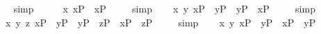 \begin{isabellebody}
\isadelimproof
\ %
\endisadelimproof
%
\isatagproof
{}\isamarkupfalse%
\ simp\ \isamarkupfalse%
%
\endisatagproof
{\isafoldproof}%
%
\isadelimproof
%
\endisadelimproof
\ \isanewline
\isanewline
\ \isamarkupfalse%
\ {\isachardoublequoteopen}{\isacharbrackleft}{\isacharparenleft}\isactrlbold {\isasymforall}x{\isachardot}\ x\isactrlsup P\ \isactrlbold {\isacharequal}\ x\isactrlsup P{\isacharparenright}{\isacharbrackright}\ {\isacharequal}\ {\isasymtop}{\isachardoublequoteclose}%
\isadelimproof
\ %
\endisadelimproof
%
\isatagproof
{}\isamarkupfalse%
\ simp\ \isamarkupfalse%
%
\endisatagproof
{\isafoldproof}%
%
\isadelimproof
%
\endisadelimproof
\isanewline
\ \isamarkupfalse%
\ {\isachardoublequoteopen}{\isacharbrackleft}{\isacharparenleft}\isactrlbold {\isasymforall}x\ y{\isachardot}\ x\isactrlsup P\ \isactrlbold {\isacharequal}\ y\isactrlsup P\ \isactrlbold {\isasymrightarrow}\ y\isactrlsup P\ \isactrlbold {\isacharequal}\ x\isactrlsup P{\isacharparenright}{\isacharbrackright}\ {\isacharequal}\ {\isasymtop}{\isachardoublequoteclose}%
\isadelimproof
\ %
\endisadelimproof
%
\isatagproof
{}\isamarkupfalse%
\ simp\ \isamarkupfalse%
%
\endisatagproof
{\isafoldproof}%
%
\isadelimproof
%
\endisadelimproof
\isanewline
\ \isamarkupfalse%
\ {\isachardoublequoteopen}{\isacharbrackleft}{\isacharparenleft}\isactrlbold {\isasymforall}x\ y\ z{\isachardot}\ {\isacharparenleft}x\isactrlsup P\ \isactrlbold {\isacharequal}\ y\isactrlsup P\ \isactrlbold {\isasymand}\ y\isactrlsup P\ \isactrlbold {\isacharequal}\ z\isactrlsup P{\isacharparenright}\ \isactrlbold {\isasymrightarrow}\ x\isactrlsup P\ \isactrlbold {\isacharequal}\ z\isactrlsup P{\isacharparenright}{\isacharbrackright}\ {\isacharequal}\ {\isasymtop}{\isachardoublequoteclose}%
\isadelimproof
\ %
\endisadelimproof
%
\isatagproof
{}\isamarkupfalse%
\ simp\ \isamarkupfalse%
%
\endisatagproof
{\isafoldproof}%
%
\isadelimproof
%
\endisadelimproof
\isanewline
\ \isamarkupfalse%
\ {\isachardoublequoteopen}{\isacharbrackleft}{\isacharparenleft}\isactrlbold {\isasymforall}x\ y{\isachardot}\ x\isactrlsup P\ \isactrlbold {\isacharequal}\ y\isactrlsup P\ \isactrlbold {\isasymrightarrow}\ \isactrlbold {\isasymbox}{\isacharparenleft}x\isactrlsup P\ \isactrlbold {\isacharequal}\ y\isactrlsup P{\isacharparenright}{\isacharparenright}{\isacharbrackright}\ {\isacharequal}\ {\isasymtop}{\isachardoublequoteclose}%

\end{isabellebody}
